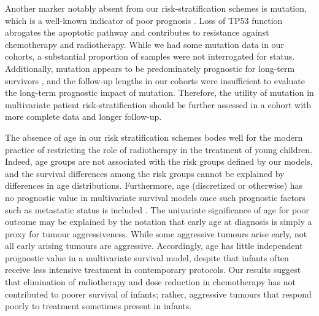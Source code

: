 Another marker notably absent from our risk-stratification schemes is  mutation, which is a well-known indicator of poor prognosis . Loss of TP53 function abrogates the apoptotic pathway and contributes to resistance against chemotherapy and radiotherapy. While we had some  mutation data in our cohorts, a substantial proportion of samples were not interrogated for  status. Additionally,  mutation appears to be predominately prognostic for long-term survivors , and the follow-up lengths in our cohorts were insufficient to evaluate the long-term prognostic impact of  mutation. Therefore, the utility of  mutation in multivariate patient risk-stratification should be further assessed in a cohort with more complete data and longer follow-up.

The absence of age in our risk stratification schemes bodes well for the modern practice of restricting the role of radiotherapy in the treatment of young children. Indeed, age groups are not associated with the risk groups defined by our models, and the survival differences among the risk groups cannot be explained by differences in age distributions. Furthermore, age (discretized or otherwise) has no prognostic value in multivariate survival models once such prognostic factors such as metastatic status is included . The univariate significance of age for poor outcome may be explained by the notation that early age at diagnosis is simply a proxy for tumour aggressiveness. While some aggressive tumours arise early, not all early arising tumours are aggressive. Accordingly, age has little independent prognostic value in a multivariate survival model, despite that infants often receive less intensive treatment in contemporary protocols. Our results suggest that elimination of radiotherapy and dose reduction in chemotherapy has not contributed to poorer survival of infants; rather, aggressive tumours that respond poorly to treatment sometimes present in infants.

